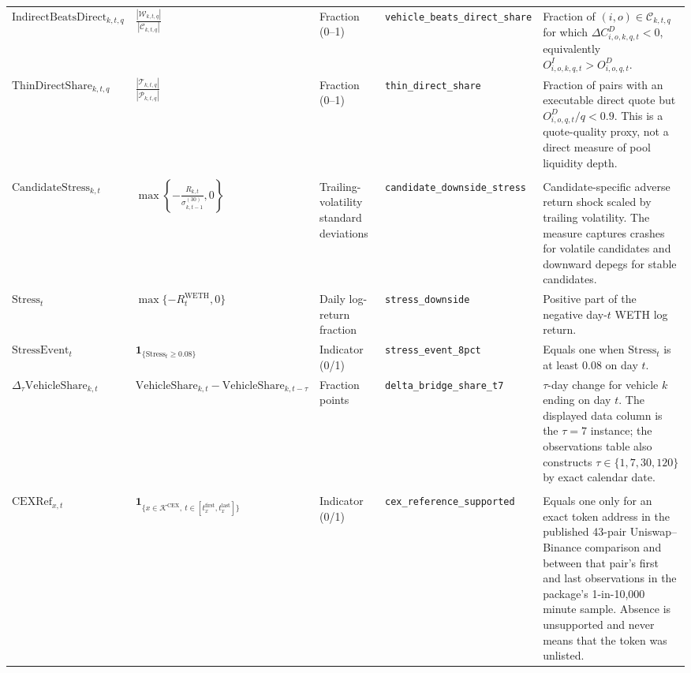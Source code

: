 \begin{tabularx}{\linewidth}{@{}>{\raggedright\arraybackslash}X>{\raggedright\arraybackslash}Xl>{\raggedright\arraybackslash}X>{\raggedright\arraybackslash}X@{}}
$\mathrm{IndirectBeatsDirect}_{k,t,q}$ & $\displaystyle\frac{|\mathcal W_{k,t,q}|}{|\mathcal C_{k,t,q}|}$ & Fraction (0--1) & \texttt{vehicle\_\allowbreak{}beats\_\allowbreak{}direct\_\allowbreak{}share} & Fraction of $(i,o)\in\mathcal C_{k,t,q}$ for which $\Delta C^D_{i,o,k,q,t}<0$, equivalently $O^I_{i,o,k,q,t}>O^D_{i,o,q,t}$. \\
$\mathrm{ThinDirectShare}_{k,t,q}$ & $\displaystyle\frac{|\mathcal T_{k,t,q}|}{|\mathcal P_{k,t,q}|}$ & Fraction (0--1) & \texttt{thin\_\allowbreak{}direct\_\allowbreak{}share} & Fraction of pairs with an executable direct quote but $O^D_{i,o,q,t}/q<0.9$. This is a quote-quality proxy, not a direct measure of pool liquidity depth. \\
\addlinespace
\multicolumn{5}{@{}l}{\textit{Stress and dynamic variables}} \\
$\mathrm{CandidateStress}_{k,t}$ & $\displaystyle\max\left\{-\frac{R_{k,t}}{\sigma^{(30)}_{k,t-1}},0\right\}$ & Trailing-volatility standard deviations & \texttt{candidate\_\allowbreak{}downside\_\allowbreak{}stress} & Candidate-specific adverse return shock scaled by trailing volatility. The measure captures crashes for volatile candidates and downward depegs for stable candidates. \\
$\mathrm{Stress}_{t}$ & $\max\{-R^{\mathrm{WETH}}_t,0\}$ & Daily log-return fraction & \texttt{stress\_\allowbreak{}downside} & Positive part of the negative day-$t$ WETH log return. \\
$\mathrm{StressEvent}_{t}$ & $\mathbf{1}_{\{\mathrm{Stress}_{t}\ge 0.08\}}$ & Indicator (0/1) & \texttt{stress\_\allowbreak{}event\_\allowbreak{}8pct} & Equals one when $\mathrm{Stress}_t$ is at least $0.08$ on day $t$. \\
$\Delta_{\tau}\mathrm{VehicleShare}_{k,t}$ & $\mathrm{VehicleShare}_{k,t}-\mathrm{VehicleShare}_{k,t-\tau}$ & Fraction points & \texttt{delta\_\allowbreak{}bridge\_\allowbreak{}share\_\allowbreak{}t7} & $\tau$-day change for vehicle $k$ ending on day $t$. The displayed data column is the $\tau=7$ instance; the observations table also constructs $\tau\in\{1,7,30,120\}$ by exact calendar date. \\
\addlinespace
\multicolumn{5}{@{}l}{\textit{Reference-price support}} \\
$\mathrm{CEXRef}_{x,t}$ & $\mathbf{1}_{\{x\in\mathcal K^{\mathrm{CEX}},\ t\in[t_x^{\mathrm{first}},t_x^{\mathrm{last}}]\}}$ & Indicator (0/1) & \texttt{cex\_\allowbreak{}reference\_\allowbreak{}supported} & Equals one only for an exact token address in the published 43-pair Uniswap--Binance comparison and between that pair's first and last observations in the package's 1-in-10,000 minute sample. Absence is unsupported and never means that the token was unlisted. \\

\end{tabularx}
